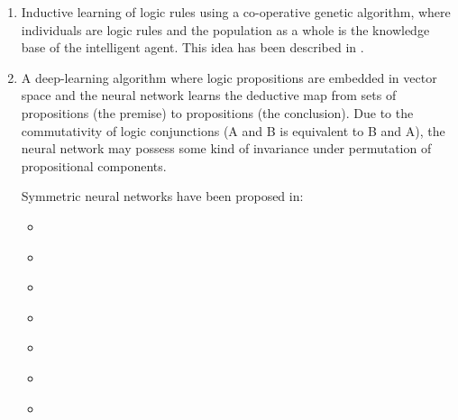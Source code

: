 \begin{enumerate}
	\item Inductive learning of logic rules using a co-operative genetic algorithm, where individuals are logic rules and the population as a whole is the knowledge base of the intelligent agent.  This idea has been described in \parencite{Freitas2002}.
	
	\item A deep-learning algorithm where logic propositions are embedded in vector space and the neural network learns the deductive map from sets of propositions (the premise) to propositions (the conclusion).  Due to the commutativity of logic conjunctions (A and B is equivalent to B and A), the neural network may possess some kind of invariance under permutation of propositional components.  
	
	Symmetric neural networks have been proposed in:
	\begin{itemize}
		\item \parencite{Gens2014}
		\item \parencite{Bie2019}
		\item \parencite{Ravanbakhsh2016}
		\item \parencite{Ravanbakhsh2017}
		\item \parencite{Qi2016}
		\item \parencite{Qi2017} 
		\item \parencite{Zaheer2017}
	\end{itemize}

\end{enumerate}

\printbibliography


